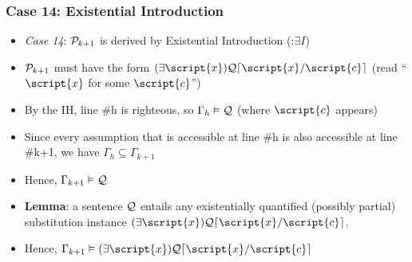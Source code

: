 \begin{frame}
\frametitle{Case 14: Existential Introduction}

\begin{itemize}[<+->]

\item \emph{Case 14}: $\mathcal{P}_{k +1}$ is derived by Existential Introduction (:$\exists I$) %

\item $\mathcal{P}_{k+1}$ must have the form $\qt{\exists}{\script{x}}\metav{Q}\substitutesome{\script{c}}{\script{x}}$ (read ``$\script{x}$ for some $\script{c}$'')

\item By the IH,  line \#h is righteous, so $\Gamma_{h} \vDash \mathcal{Q}$ (where $\script{c}$ appears)

\item Since every assumption that is accessible at line \#h is also accessible at line \#k+1, we have $\Gamma_h \subseteq \Gamma_{k+1}$

\item Hence, $\Gamma_{k+1} \vDash \mathcal{Q}$

\item \textbf{Lemma}: a sentence $\mathcal{Q}$ entails any existentially quantified (possibly partial) substitution instance $\qt{\exists}{\script{x}}\metav{Q}\substitutesome{\script{c}}{\script{x}}$. 



\item Hence, $\Gamma_{k+1} \entails \qt{\exists}{\script{x}}\metav{Q}\substitutesome{\script{c}}{\script{x}}$

\end{itemize}
\end{frame}



